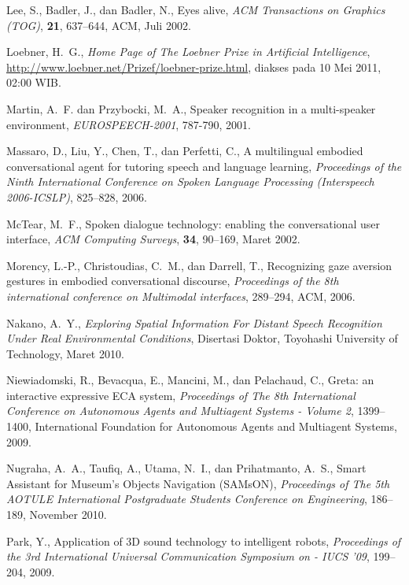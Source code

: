 \begin{thebibliography}{10}
Lee, S., Badler, J., dan Badler, N.,
  {Eyes alive},
  {\em ACM Transactions on Graphics (TOG)\/},
  \textbf{21}, 637--644, ACM, Juli 2002.

Loebner, H.~G.,
  {\em Home Page of The Loebner Prize in Artificial Intelligence\/},
  \urlprefix\url{http://www.loebner.net/Prizef/loebner-prize.html},
  diakses pada 10 Mei 2011, 02:00 WIB.

Martin, A.~F. dan Przybocki, M.~A.,
  Speaker recognition in a multi-speaker environment,
  {\em EUROSPEECH-2001\/}, 787-790, 2001.

Massaro, D., Liu, Y., Chen, T., dan Perfetti, C., 
  {A multilingual embodied conversational agent for tutoring speech and language learning},
  {\em Proceedings of the Ninth International Conference on Spoken Language Processing
  (Interspeech 2006-ICSLP)\/}, 825--828, 2006.

McTear, M.~F.,
  {Spoken dialogue technology: enabling the conversational user interface,}
  {\em ACM Computing Surveys\/}, \textbf{34}, 90--169, Maret 2002.

Morency, L.-P., Christoudias, C.~M., dan Darrell, T.,
  {Recognizing gaze aversion gestures in embodied conversational discourse},
  {\em Proceedings of the 8th international conference on Multimodal interfaces\/},
  289--294, ACM, 2006.

Nakano, A.~Y.,
  {\em Exploring {Spatial Information For Distant Speech Recognition Under
  Real Environmental Conditions}\/}, Disertasi Doktor,
  Toyohashi University of Technology, Maret 2010.

Niewiadomski, R., Bevacqua, E., Mancini, M., dan Pelachaud, C.,
  {Greta: an interactive expressive ECA system,}
  {\em Proceedings of The 8th International Conference on Autonomous Agents and
  Multiagent Systems - Volume 2\/}, 1399--1400,
  International Foundation for Autonomous Agents and Multiagent Systems, 2009.

Nugraha, A.~A., Taufiq, A., Utama, N.~I., dan Prihatmanto, A.~S.,
  {Smart Assistant for Museum's Objects Navigation (SAMsON)},
  {\em Proceedings of The 5th AOTULE International Postgraduate
  Students Conference on Engineering\/}, 186--189, November 2010.

Park, Y.,
  {Application of 3D sound technology to intelligent robots},
  {\em Proceedings of the 3rd International Universal Communication Symposium
  on - IUCS '09\/}, 199--204, 2009.


\end{thebibliography}
